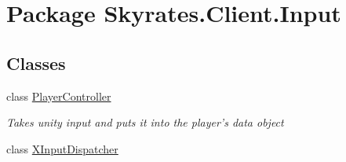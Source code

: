 \hypertarget{namespace_skyrates_1_1_client_1_1_input}{\section{Package Skyrates.\-Client.\-Input}
\label{namespace_skyrates_1_1_client_1_1_input}
}
\subsection*{Classes}
\begin{DoxyCompactItemize}
\item 
class \hyperlink{class_skyrates_1_1_client_1_1_input_1_1_player_controller}{Player\-Controller}
\begin{DoxyCompactList}\small\item\em Takes unity input and puts it into the player's data object \end{DoxyCompactList}\item 
class \hyperlink{class_skyrates_1_1_client_1_1_input_1_1_x_input_dispatcher}{X\-Input\-Dispatcher}
\end{DoxyCompactItemize}
